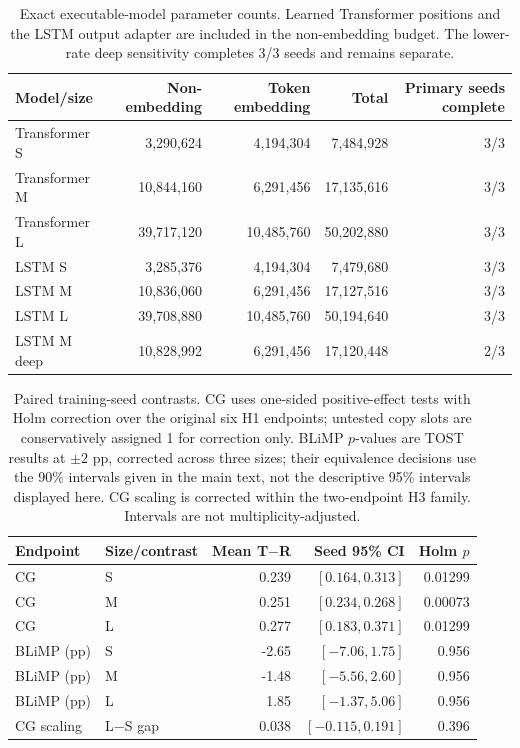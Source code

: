 \documentclass[10pt]{article}
\begin{document}
\begin{table}[ht]
\centering
\small
\begin{tabular}{lrrrr}
\toprule
Model/size & Non-embedding & Token embedding & Total & Primary seeds complete \\
\midrule
Transformer S & 3,290,624 & 4,194,304 & 7,484,928 & 3/3 \\
Transformer M & 10,844,160 & 6,291,456 & 17,135,616 & 3/3 \\
Transformer L & 39,717,120 & 10,485,760 & 50,202,880 & 3/3 \\
LSTM S & 3,285,376 & 4,194,304 & 7,479,680 & 3/3 \\
LSTM M & 10,836,060 & 6,291,456 & 17,127,516 & 3/3 \\
LSTM L & 39,708,880 & 10,485,760 & 50,194,640 & 3/3 \\
LSTM M deep & 10,828,992 & 6,291,456 & 17,120,448 & 2/3 \\
\bottomrule
\end{tabular}
\caption{Exact executable-model parameter counts. Learned Transformer positions and the LSTM output adapter are included in the non-embedding budget. The lower-rate deep sensitivity completes 3/3 seeds and remains separate.}
\label{tab:exactcounts}
\end{table}

\begin{table}[ht]
\centering
\small
\begin{tabular}{llrrr}
\toprule
Endpoint & Size/contrast & Mean T$-$R & Seed 95\% CI & Holm $p$ \\
\midrule
CG & S & 0.239 & $[0.164,0.313]$ & 0.01299 \\
CG & M & 0.251 & $[0.234,0.268]$ & 0.00073 \\
CG & L & 0.277 & $[0.183,0.371]$ & 0.01299 \\
BLiMP (pp) & S & -2.65 & $[-7.06,1.75]$ & 0.956 \\
BLiMP (pp) & M & -1.48 & $[-5.56,2.60]$ & 0.956 \\
BLiMP (pp) & L & 1.85 & $[-1.37,5.06]$ & 0.956 \\
CG scaling & L$-$S gap & 0.038 & $[-0.115,0.191]$ & 0.396 \\
\bottomrule
\end{tabular}
\caption{Paired training-seed contrasts. CG uses one-sided positive-effect tests with Holm correction over the original six H1 endpoints; untested copy slots are conservatively assigned 1 for correction only. BLiMP $p$-values are TOST results at $\pm2$ pp, corrected across three sizes; their equivalence decisions use the 90\% intervals given in the main text, not the descriptive 95\% intervals displayed here. CG scaling is corrected within the two-endpoint H3 family. Intervals are not multiplicity-adjusted.}
\label{tab:inference}
\end{table}
\end{document}
